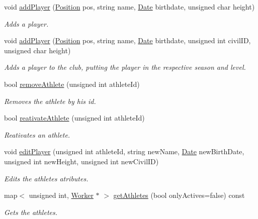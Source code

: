 \begin{DoxyCompactItemize}
void \hyperlink{class_club_a8d73696e267c2abfc8601b710a5c5202}{add\+Player} (\hyperlink{_utils_8hpp_ab91b34ae619fcdfcba4522b4f335bf83}{Position} pos, string name, \hyperlink{class_date}{Date} birthdate, unsigned char height)
\begin{DoxyCompactList}\small\item\em Adds a player. \end{DoxyCompactList}\item 
void \hyperlink{class_club_a45e40e92c28330c08ea0739f6213056f}{add\+Player} (\hyperlink{_utils_8hpp_ab91b34ae619fcdfcba4522b4f335bf83}{Position} pos, string name, \hyperlink{class_date}{Date} birthdate, unsigned int civil\+ID, unsigned char height)
\begin{DoxyCompactList}\small\item\em Adds a player to the club, putting the player in the respective season and level. \end{DoxyCompactList}\item 
bool \hyperlink{class_club_a0ba1e1dd655c3866111476aed700a7ac}{remove\+Athlete} (unsigned int athlete\+Id)
\begin{DoxyCompactList}\small\item\em Removes the athlete by his id. \end{DoxyCompactList}\item 
bool \hyperlink{class_club_a2ecfd114e812c310d6155d111b500d6c}{reativate\+Athlete} (unsigned int athlete\+Id)
\begin{DoxyCompactList}\small\item\em Reativates an athlete. \end{DoxyCompactList}\item 
void \hyperlink{class_club_adb3e6585bb13e96d4a9395f06f493170}{edit\+Player} (unsigned int athlete\+Id, string new\+Name, \hyperlink{class_date}{Date} new\+Birth\+Date, unsigned int new\+Height, unsigned int new\+Civil\+ID)
\begin{DoxyCompactList}\small\item\em Edits the athlete\textquotesingle{}s atributes. \end{DoxyCompactList}\item 
map$<$ unsigned int, \hyperlink{class_worker}{Worker} $\ast$ $>$ \hyperlink{class_club_a30cf5a5b67250ca9bc5f7aa5a7628f92}{get\+Athletes} (bool only\+Actives=false) const
\begin{DoxyCompactList}\small\item\em Gets the athletes. \end{DoxyCompactList}\item 

\end{DoxyCompactItemize}
